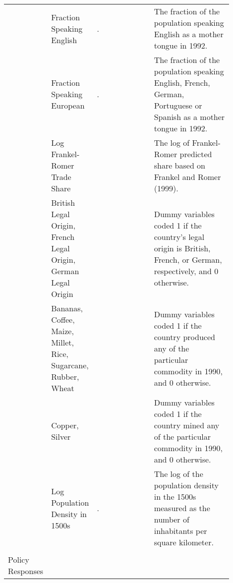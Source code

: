 \begin{table}[!htbp]
\begin{tabularx}{\linewidth}{p{0.07\linewidth} p{0.2\linewidth} p{0.27\linewidth} p{0.36\linewidth}}
    & Fraction Speaking English & \citet{hallWhyCountriesProduceReplicationData}. & The fraction of the population speaking English as a mother tongue in 1992.\\ %
    
    & Fraction Speaking European & \citet{hallWhyCountriesProduceReplicationData}. & The fraction of the population speaking English, French, German, Portuguese or Spanish as a mother tongue in 1992.\\ %
    
    & Log Frankel-Romer Trade Share & \citet{hallWhyCountriesProduceReplicationData} & The log of Frankel-Romer predicted share based on Frankel and Romer (1999).\\ 
    
    & British Legal Origin, French Legal Origin, German Legal Origin & \citet{portaLawFinanceReplicationData} & Dummy variables coded 1 if the country's legal origin is British, French, or German, respectively, and 0 otherwise. \\
    
    & Bananas, Coffee, Maize, Millet, Rice, Sugarcane, Rubber, Wheat & \citet{easterlyReplicationData, foodandagricultureassociationoftheunitednationsFAOGlobalStatistical2020} & Dummy variables coded 1 if the country produced any of the particular commodity in 1990, and 0 otherwise. \\
    
    & Copper, Silver & \citet{easterlyReplicationData, CopperStatistics, SilverStatistics} & Dummy variables coded 1 if the country mined any of the particular commodity in 1990, and 0 otherwise. \\
    
    & Log Population Density in 1500s & \citet{UnbundlingInstitutionsReplicationData}. & The log of the population density in the 1500s measured as the number of inhabitants per square kilometer.  \\ \hline \\[-1.8ex] %
    
    Policy Responses &
    

\end{tabularx}
\end{table}
